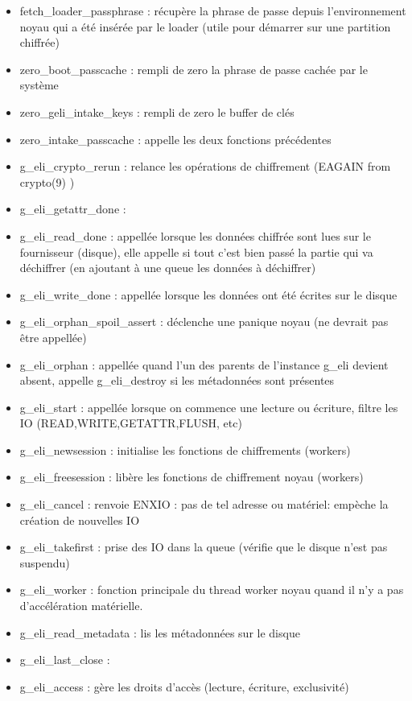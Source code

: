 \begin{itemize}
	\item fetch\_loader\_passphrase : récupère la phrase de passe depuis 
		l'environnement noyau qui a été insérée par le loader 
		(utile pour démarrer sur une partition chiffrée)
	\item zero\_boot\_passcache : rempli de zero la phrase de passe cachée par le 
		système
	\item zero\_geli\_intake\_keys : rempli de zero le buffer de clés
	\item zero\_intake\_passcache : appelle les deux fonctions précédentes
	\item g\_eli\_crypto\_rerun : relance les opérations de chiffrement (EAGAIN from
		crypto(9) )
	\item g\_eli\_getattr\_done : 
	\item g\_eli\_read\_done : appellée lorsque les données chiffrée sont lues sur le 
		fournisseur (disque), elle appelle si tout c'est bien passé la partie
		qui va déchiffrer (en ajoutant à une queue les données à déchiffrer)
	\item g\_eli\_write\_done : appellée lorsque les données ont été écrites sur le 
		disque
	\item g\_eli\_orphan\_spoil\_assert : déclenche une panique noyau (ne devrait pas
		être appellée)
	\item g\_eli\_orphan : appellée quand l'un des parents de l'instance g\_eli 
		devient absent, appelle g\_eli\_destroy si les métadonnées sont présentes
	\item g\_eli\_start : appellée lorsque on commence une lecture ou écriture, 
		filtre les IO (READ,WRITE,GETATTR,FLUSH, etc)
	\item g\_eli\_newsession : initialise les fonctions de chiffrements (workers)
	\item g\_eli\_freesession : libère les fonctions de chiffrement noyau (workers)
	\item g\_eli\_cancel : renvoie ENXIO : pas de tel adresse ou matériel: empèche
		la création de nouvelles IO
	\item g\_eli\_takefirst : prise des IO dans la queue (vérifie que le disque n'est
		pas suspendu)
	\item g\_eli\_worker : fonction principale du thread worker noyau quand il n'y a
		pas d'accélération matérielle.
	\item g\_eli\_read\_metadata : lis les métadonnées sur le disque
	\item g\_eli\_last\_close :
	\item g\_eli\_access : gère les droits d'accès (lecture, écriture, exclusivité)

\end{itemize}
